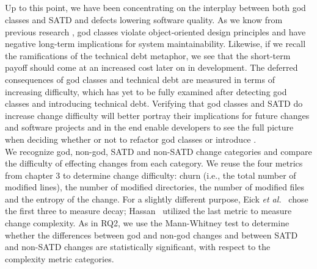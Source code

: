 \subsection*{\chapterIVrqIII}

Up to this point, we have been concentrating on the interplay between both god classes and SATD and defects lowering software quality. As we know from previous research \cite{marinescu2004detection}, god classes violate object-oriented design principles and have negative long-term implications for system maintainability. Likewise, if we recall the ramifications of the technical debt metaphor, we see that the short-term payoff should come at an increased cost later on in development. The deferred consequences of god classes and technical debt are measured in terms of increasing difficulty, which has yet to be fully examined after detecting god classes and introducing technical debt. Verifying that god classes and SATD do increase change difficulty will better portray their implications for future changes and software projects and in the end enable developers to see the full picture when deciding whether or not to refactor god classes or introduce \SATD. \\

We recognize god, non-god, SATD and non-SATD change categories and compare the difficulty of effecting changes from each category. We reuse the four metrics from chapter 3 to determine change difficulty: churn (i.e., the total number of modified lines), the number of modified directories, the number of modified files and the entropy of the change. For a slightly different purpose, Eick \emph{et al.}~\cite{eick2001decay} chose the first three to measure decay; Hassan~\cite{hassan2009predicting} utilized the last metric to measure change complexity. As in RQ2, we use the Mann-Whitney test \cite{mann1947test} to determine whether the differences between god and non-god changes and between SATD and non-SATD changes are statistically significant, with respect to the complexity metric categories. 





